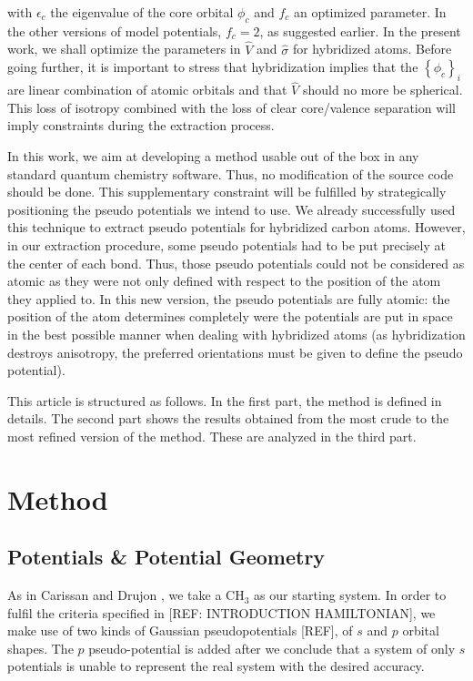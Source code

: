 \documentclass[journal=jctcce,manuscript=article]{achemso}
\begin{document}
with $\epsilon_c$ the eigenvalue of the core orbital $\phi_c$ and
$f_c$ an optimized parameter.
In the other versions of model potentials, $f_c=2$, as suggested earlier.\cite{houjer_aspects_1978}
In the present work, we shall optimize the parameters in $\hat{V}$ and $\hat{\sigma}$
for hybridized atoms.
Before going further, it is important to stress that hybridization implies that the
$\left\{\phi_c\right\}_i$ are linear combination of atomic orbitals and that
$\hat{V}$ should no more be spherical.
This loss of isotropy combined with the loss of clear core/valence separation
will imply constraints during the extraction process.

In this work, we aim at developing a method usable out of the box in any standard
quantum chemistry software.
Thus, no modification of the source code should be done.
This supplementary constraint will be fulfilled by strategically positioning the pseudo potentials
we intend to use. 
We already successfully used this technique to extract pseudo potentials for hybridized carbon
atoms.\cite{drujon_pseudopotentials_2013}
However, in our extraction procedure, some pseudo potentials had to be put precisely at the center
of each bond.
Thus, those pseudo potentials could not be considered as atomic as they were not only defined
with respect to the position of the atom they applied to.
In this new version, the pseudo potentials are fully atomic: the position of the atom
determines completely were the potentials are put in space in the best possible manner
when dealing with hybridized atoms (as hybridization destroys anisotropy, the preferred orientations
must be given to define the pseudo potential).

This article is structured as follows.
In the first part, the method is defined in details.
The second part shows the results obtained from the most crude to the most refined
version of the method.
These are analyzed in the third part.

\section{Method}

\subsection{Potentials \& Potential Geometry}

As in Carissan and Drujon \cite{drujon_pseudopotentials_2013}, we take a CH\(_{3}\) as our starting system. In order to fulfil the criteria specified in [REF: INTRODUCTION HAMILTONIAN], we make use of two kinds of Gaussian pseudopotentials [REF], of \(s\) and \(p\) orbital shapes. The \(p\) pseudo-potential is added after we conclude that a system of only \(s\) potentials is unable to represent the real system with the desired accuracy. 
\end{document}
